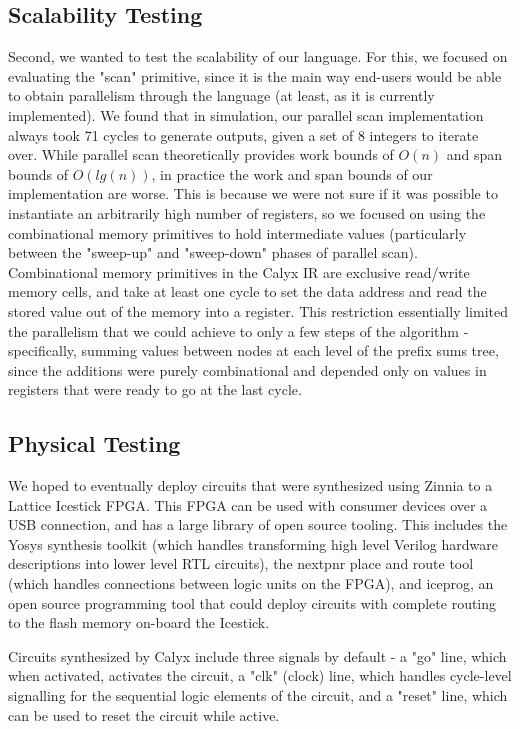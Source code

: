 \documentclass[12pt]{article}
\begin{document}
\subsection{Scalability Testing}
Second, we wanted to test the scalability of our language. For this, we focused on evaluating the "scan" primitive, since
it is the main way end-users would be able to obtain parallelism through the language (at least, as it is currently implemented).
We found that in simulation, our parallel scan implementation always took 71 cycles to generate outputs, given a set of 8 integers
to iterate over. While parallel scan theoretically provides work bounds of $O(n)$ and span bounds of $O(lg(n))$, in practice the
work and span bounds of our implementation are worse. This is because we were not sure if it was possible to instantiate
an arbitrarily high number of registers, so we focused on using the combinational memory primitives to hold intermediate values
(particularly between the "sweep-up" and "sweep-down" phases of parallel scan). Combinational memory primitives in the Calyx IR
are exclusive read/write memory cells, and take at least one cycle to set the data address and read the stored value out of the memory
into a register. This restriction essentially limited the parallelism that we could achieve to only a few steps of the algorithm - specifically,
summing values between nodes at each level of the prefix sums tree, since the additions were purely combinational and depended only
on values in registers that were ready to go at the last cycle.
\subsection{Physical Testing}
We hoped to eventually deploy circuits that were synthesized using Zinnia to a Lattice Icestick FPGA.
This FPGA can be used with consumer devices over a USB connection, and has a large library of open source tooling.
This includes the Yosys synthesis toolkit (which handles transforming high level Verilog hardware descriptions into
lower level RTL circuits), the nextpnr place and route tool (which handles connections between logic units
on the FPGA), and iceprog, an open source programming tool that could deploy circuits with complete routing
to the flash memory on-board the Icestick.

Circuits synthesized by Calyx include three signals by default - a "go" line, which when activated,
activates the circuit, a "clk" (clock) line, which handles cycle-level signalling for the sequential logic
elements of the circuit, and a "reset" line, which can be used to reset the circuit while active.
\end{document}
